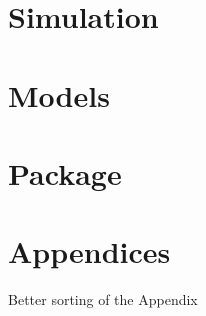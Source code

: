 \documentclass[12pt,a4paper]{article}
\begin{document}
\hypertarget{simulation}{%
\section{Simulation}\label{simulation}}

\hypertarget{models}{%
\section{Models}\label{models}}

\hypertarget{package}{%
\section{Package}\label{package}}

\pagebreak


\printbibliography[title = References]
\cleardoublepage

\begin{refsection}
\nocite{R-base}
\nocite{R-stargazer}
\nocite{R-stringr}
\nocite{R-tidyr}
\nocite{R-dplyr}
\nocite{R-glmnet}
\nocite{R-class}
\nocite{R-MASS}
\nocite{R-plm}
\nocite{R-leaps}
\nocite{R-caret}
\nocite{R-tree}
\nocite{R-gbm}
\nocite{R-plotmo}
\nocite{R-pls}
\nocite{R-splines}
\nocite{R-tictoc}
\nocite{R-plotly}
\nocite{R-inspectdf}
\nocite{R-rpart}
\nocite{R-rpart.plot}
\nocite{R-stargazer}
\nocite{R-knitr}
\nocite{R-purrr}
\nocite{R-randomForest}
\nocite{R-rstudioapi}





\nocite{R-Studio}

\printbibliography[title = Software-References]
\end{refsection}

\cleardoublepage
\appendix
\setcounter{table}{0}
\setcounter{figure}{0}
\renewcommand{\thetable}{A\arabic{table}}
\renewcommand{\thefigure}{A\arabic{figure}}


\hypertarget{appendices}{%
\section{Appendices}\label{appendices}}

Better sorting of the Appendix

\restoregeometry
\end{document}
